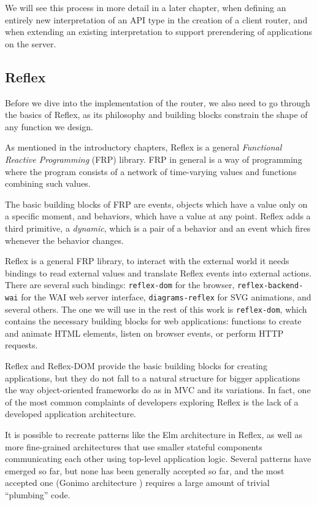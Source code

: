 \documentclass[english,zadani,odsaz]{fitthesis}
\begin{document}
We will see this process in more detail in a later chapter, when defining an
entirely new interpretation of an API type in the creation of a client router,
and when extending an existing interpretation to support prerendering of
applications on the server.

\subsection{Reflex}
\label{sec:org9261012}
Before we dive into the implementation of the router, we also need to go through
the basics of Reflex, as its philosophy and building blocks constrain the
shape of any function we design.

As mentioned in the introductory chapters, Reflex is a general \emph{Functional
Reactive Programming} (FRP) library. FRP in general is a way of programming where
the program consists of a network of time-varying values and functions combining
such values.

The basic building blocks of FRP are events, objects which have a value only on
a specific moment, and behaviors, which have a value at any point. Reflex adds a
third primitive, a \emph{dynamic}, which is a pair of a behavior and an event which
fires whenever the behavior changes.

Reflex is a general FRP library, to interact with the external world it needs
bindings to read external values and translate Reflex events into external
actions. There are several such bindings: \texttt{reflex-dom} for the browser,
\texttt{reflex-backend-wai} for the WAI web server interface, \texttt{diagrams-reflex} for SVG
animations, and several others. The one we will use in the rest of this work is
\texttt{reflex-dom}, which contains the necessary building blocks for web applications:
functions to create and animate HTML elements, listen on browser events, or
perform HTTP requests.

Reflex and Reflex-DOM provide the basic building blocks for creating
applications, but they do not fall to a natural structure for bigger applications
the way object-oriented frameworks do as in MVC and its variations. In fact, one
of the most common complaints of developers exploring Reflex is the lack of a
developed application architecture.

It is possible to recreate patterns like the Elm architecture in Reflex, as well
as more fine-grained architectures that use smaller stateful components
communicating each other using top-level application logic. Several patterns
have emerged so far, but none has been generally accepted so far, and the most
accepted one (Gonimo architecture \cite{gonimo}) requires a large amount of
trivial ``plumbing'' code.
\end{document}
